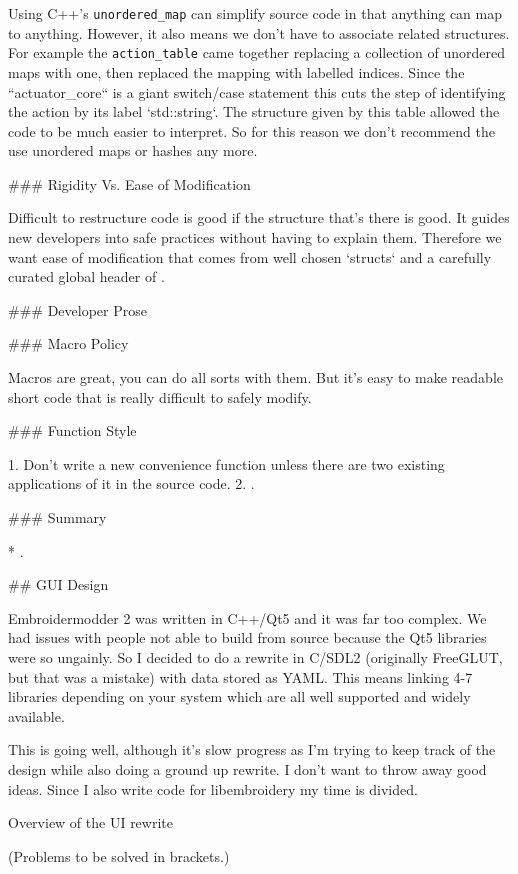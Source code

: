 Using C++'s \texttt{unordered\_map} can simplify source code in that anything can
map to anything. However, it also means we don't have to associate related structures.
For example the \texttt{action\_table} came together replacing a collection of unordered maps
with one, then replaced the mapping with labelled indices. Since the ``actuator\_core``
is a giant switch/case statement this cuts the step of identifying the action by its
label `std::string`.
The structure given by this table allowed the code to be much
easier to interpret. So for this reason we don't recommend the use unordered maps or hashes any more.

### Rigidity Vs. Ease of Modification

Difficult to restructure code is good if the structure that's there is good.
It guides new developers into safe practices without having to explain them.
Therefore we want ease of modification that comes from well chosen `structs`
and a carefully curated global header of .

### Developer Prose

### Macro Policy

Macros are great, you can do all sorts with them. But it's easy to make readable
short code that is really difficult to safely modify.

### Function Style

1. Don't write a new convenience function unless there are two existing applications of it in the source code.
2. .

### Summary

* .

## GUI Design


Embroidermodder 2 was written in C++/Qt5 and it was far too complex. We had
issues with people not able to build from source because the Qt5 libraries were
so ungainly. So I decided to do a rewrite in C/SDL2 (originally FreeGLUT, but
that was a mistake) with data stored as YAML. This means linking 4-7 libraries
depending on your system which are all well supported and widely available.

This is going well, although it's slow progress as I'm trying to keep track of
the design while also doing a ground up rewrite. I don't want to throw away good
ideas. Since I also write code for libembroidery my time is divided.

Overview of the UI rewrite

(Problems to be solved in brackets.)

